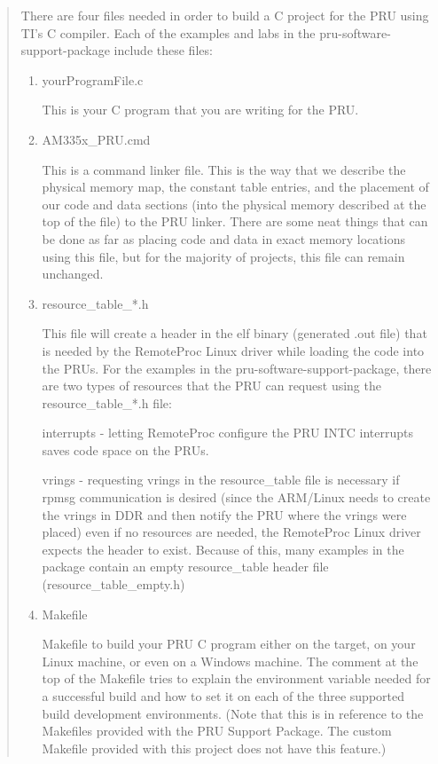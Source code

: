 \begin{quotation}
There are four files needed in order to build a C project for the PRU using TI's C compiler. Each of the examples and labs in the pru-software-support-package include these files:
\begin{enumerate}

\item  yourProgramFile.c

This is your C program that you are writing for the PRU.

\item   AM335x\_PRU.cmd

This is a command linker file. This is the way that we describe the physical memory map, the constant table entries, and the placement of our code and data sections (into the physical memory described at the top of the file) to the PRU linker. There are some neat things that can be done as far as placing code and data in exact memory locations using this file, but for the majority of projects, this file can remain unchanged.

\item   resource\_table\_*.h

This file will create a header in the elf binary (generated .out file) that is needed by the RemoteProc Linux driver while loading the code into the PRUs. For the examples in the pru-software-support-package, there are two types of resources that the PRU can request using the resource\_table\_*.h file:

interrupts - letting RemoteProc configure the PRU INTC interrupts saves code space on the PRUs.

vrings - requesting vrings in the resource\_table file is necessary if rpmsg communication is desired (since the ARM/Linux needs to create the vrings in DDR and then notify the PRU where the vrings were placed)
even if no resources are needed, the RemoteProc Linux driver expects the header to exist. Because of this, many examples in the package contain an empty resource\_table header file (resource\_table\_empty.h)

\item   Makefile

Makefile to build your PRU C program either on the target, on your Linux machine, or even on a Windows machine. The comment at the top of the Makefile tries to explain the environment variable needed for a successful build and how to set it on each of the three supported build development environments.  (Note that this is in reference to the Makefiles provided with the PRU Support Package.  The custom Makefile provided with this project does not have this feature.)

\end{enumerate}
\end{quotation}







